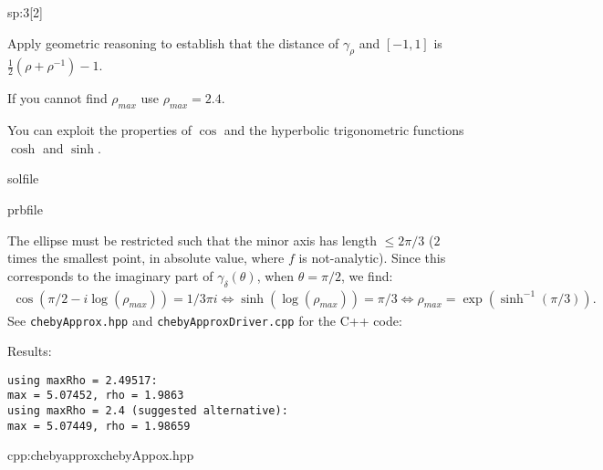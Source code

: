 \begin{samproblem}
\begin{subproblem}{sp:3}[2]
  \begin{samhint}
    Apply geometric reasoning to establish that the distance of $\gamma_\rho$ and $[-1,1]$ is $\frac{1}{2}(\rho + \rho^{-1}) - 1$.
  \end{samhint}
 
  \begin{samhint}
    If you cannot find $\rho_{max}$ use $\rho_{max} = 2.4$.
  \end{samhint}
 
  \begin{samhint}
    You can exploit the properties of $\cos$ and the hyperbolic trigonometric functions $\cosh$ and $\sinh$.
  \end{samhint}

  \begin{samwriteprbpart}{solfile}
    \begin{writeverbatim}{prbfile}
      \begin{samsolution}
        The ellipse must be restricted such that the minor axis has length $\leq 2 \pi / 3$ ($2$ times the smallest point, in absolute value, 
        where $f$ is not-analytic). Since this corresponds to the imaginary part of $\gamma_\delta(\theta)$, when $\theta = \pi / 2$, we find:
        \begin{align*}
          \cos(\pi / 2 - i \log(\rho_{max})) = 1 / 3 \pi i \Leftrightarrow \sinh(\log(\rho_{max})) = 
          \pi/3 \Leftrightarrow \rho_{max} = \exp(\sinh^{-1}(\pi / 3)).
        \end{align*}
        See \verb|chebyApprox.hpp| and \verb|chebyApproxDriver.cpp| for the C++ code:

        Results:
        {\small \ttfamily
        \begin{lstlisting}
using maxRho = 2.49517:
max = 5.07452, rho = 1.9863
using maxRho = 2.4 (suggested alternative):
max = 5.07449, rho = 1.98659
        \end{lstlisting}
        }

        \begin{samcode}{cpp:chebyapprox}{chebyAppox.hpp}
          \small
          
        \end{samcode}
      \end{samsolution}
    \end{writeverbatim}
  \end{samwriteprbpart}


\end{subproblem}
\end{samproblem}
